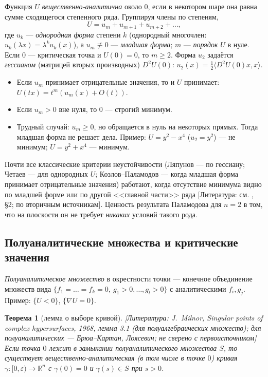 \documentclass[11pt,a4paper]{article}
\newtheorem{theorem}{Теорема}[section]
\theoremstyle{definition}
\newcommand{\R}{\mathbb R}
\newcommand{\eps}{\varepsilon}
\newcommand{\mk}[1]{\textsf{[#1]}}
\newcommand{\term}[1]{\emph{#1}}
\begin{document}
Функция $U$ \term{вещественно-аналитична} около $0$, если в некотором шаре она равна сумме
сходящегося степенного ряда. Группируя члены по степеням,
\[
U=u_m+u_{m+1}+u_{m+2}+\dots,
\]
где $u_k$ --- \term{однородная форма} степени $k$ (однородный многочлен: $u_k(\lambda x)=
\lambda^ku_k(x)$), а $u_m\not\equiv0$ --- \term{младшая форма}; $m$ --- \term{порядок} $U$ в нуле.
Если $0$ --- критическая точка и $U(0)=0$, то $m\ge2$. Форма $u_2$ задаётся \term{гессианом}
(матрицей вторых производных) $D^2U(0)$: $u_2(x)=\tfrac12\langle D^2U(0)x,x\rangle$.

\begin{itemize}[leftmargin=*]
\item Если $u_m$ принимает отрицательные значения, то и $U$ принимает: $U(tx)=t^m(u_m(x)+O(t))$.
\item Если $u_m>0$ вне нуля, то $0$ --- строгий минимум.
\item Трудный случай: $u_m\ge0$, но обращается в нуль на некоторых прямых. Тогда младшая форма
не решает дела. Пример: $U=y^2-x^4$ ($u_2=y^2$) --- не минимум; $U=y^2+x^4$ --- минимум.
\end{itemize}

Почти все классические критерии неустойчивости (Ляпунов --- по гессиану; Четаев --- для однородных
$U$; Козлов--Паламодов --- когда младшая форма принимает отрицательные значения) работают, когда
отсутствие минимума видно по младшей форме или по другой <<главной части>> ряда
\mk{Литература: см. , §2; по вторичным источникам}. Ценность
результата Паламодова для $n=2$ в том, что на плоскости он не требует \emph{никаких} условий
такого рода.

\subsection{Полуаналитические множества и критические значения}

\term{Полуаналитическое множество} в окрестности точки --- конечное объединение множеств вида
$\{f_1=\dots=f_k=0,\ g_1>0,\dots,g_l>0\}$ с аналитическими $f_i,g_j$. Пример:
$\{U<0\}$, $\{\nabla U=0\}$.

\begin{theorem}[лемма о выборе кривой]\label{thm:curve}
\mk{Литература: J.~Milnor, Singular points of complex hypersurfaces, 1968, лемма 3.1 (для
полуалгебраических множеств); для полуаналитических --- Брюа--Картан, Лоясевич; не сверено с
первоисточником} Если точка $0$ лежит в замыкании полуаналитического множества $S$, то
существует вещественно-аналитическая (в том числе в точке $0$) кривая $\gamma\colon[0,\eps)\to\R^n$ с
$\gamma(0)=0$ и $\gamma(s)\in S$ при $s>0$.
\end{theorem}
\end{document}

